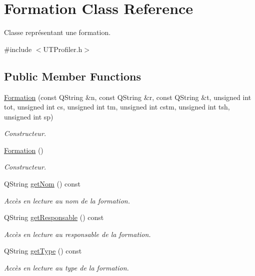 \hypertarget{class_formation}{\section{Formation Class Reference}
\label{class_formation}
}


Classe représentant une formation.  




{\ttfamily \#include $<$U\-T\-Profiler.\-h$>$}

\subsection*{Public Member Functions}
\begin{DoxyCompactItemize}
\item 
\hyperlink{class_formation_a845d387195dc1ee6c9da35b7acbd9c75}{Formation} (const Q\-String \&n, const Q\-String \&r, const Q\-String \&t, unsigned int tot, unsigned int cs, unsigned int tm, unsigned int cstm, unsigned int tsh, unsigned int sp)
\begin{DoxyCompactList}\small\item\em Constructeur. \end{DoxyCompactList}\item 
\hyperlink{class_formation_a60c3058dd353550d89183ec529909cb6}{Formation} ()
\begin{DoxyCompactList}\small\item\em Constructeur. \end{DoxyCompactList}\item 
Q\-String \hyperlink{class_formation_ae6a675062709e29c5bfc4f2da7b6ccf2}{get\-Nom} () const 
\begin{DoxyCompactList}\small\item\em Accès en lecture au nom de la formation. \end{DoxyCompactList}\item 
Q\-String \hyperlink{class_formation_ad2e117bb6b0f33dbe35014e5e1904a89}{get\-Responsable} () const 
\begin{DoxyCompactList}\small\item\em Accès en lecture au responsable de la formation. \end{DoxyCompactList}\item 
Q\-String \hyperlink{class_formation_a54006f84fbbd0591527f5036ba8c9b53}{get\-Type} () const 
\begin{DoxyCompactList}\small\item\em Accès en lecture au type de la formation. \end{DoxyCompactList}\item 

\end{DoxyCompactItemize}
